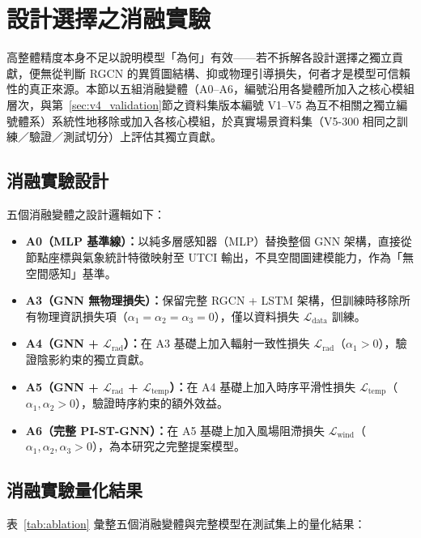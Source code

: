\section{設計選擇之消融實驗}
\label{sec:ablation}

高整體精度本身不足以說明模型「為何」有效——若不拆解各設計選擇之獨立貢獻，便無從判斷 RGCN 的異質圖結構、抑或物理引導損失，何者才是模型可信賴性的真正來源。本節以五組消融變體（A0--A6，編號沿用各變體所加入之核心模組層次，與第~\ref{sec:v4_validation}節之資料集版本編號 V1--V5 為互不相關之獨立編號體系）系統性地移除或加入各核心模組，於真實場景資料集（V5-300 相同之訓練／驗證／測試切分）上評估其獨立貢獻。

\subsection{消融實驗設計}
\label{subsec:ablation_design}

五個消融變體之設計邏輯如下：

\begin{itemize}
    \item \textbf{A0（MLP 基準線）：}以純多層感知器（MLP）替換整個 GNN 架構，直接從節點座標與氣象統計特徵映射至 UTCI 輸出，不具空間圖建模能力，作為「無空間感知」基準。
    \item \textbf{A3（GNN 無物理損失）：}保留完整 RGCN + LSTM 架構，但訓練時移除所有物理資訊損失項（$\alpha_1 = \alpha_2 = \alpha_3 = 0$），僅以資料損失 $\mathcal{L}_{\text{data}}$ 訓練。
    \item \textbf{A4（GNN + $\mathcal{L}_{\text{rad}}$）：}在 A3 基礎上加入輻射一致性損失 $\mathcal{L}_{\text{rad}}$（$\alpha_1 > 0$），驗證陰影約束的獨立貢獻。
    \item \textbf{A5（GNN + $\mathcal{L}_{\text{rad}}$ + $\mathcal{L}_{\text{temp}}$）：}在 A4 基礎上加入時序平滑性損失 $\mathcal{L}_{\text{temp}}$（$\alpha_1, \alpha_2 > 0$），驗證時序約束的額外效益。
    \item \textbf{A6（完整 PI-ST-GNN）：}在 A5 基礎上加入風場阻滯損失 $\mathcal{L}_{\text{wind}}$（$\alpha_1, \alpha_2, \alpha_3 > 0$），為本研究之完整提案模型。
\end{itemize}


\subsection{消融實驗量化結果}
\label{subsec:ablation_results}

表~\ref{tab:ablation} 彙整五個消融變體與完整模型在測試集上的量化結果：

